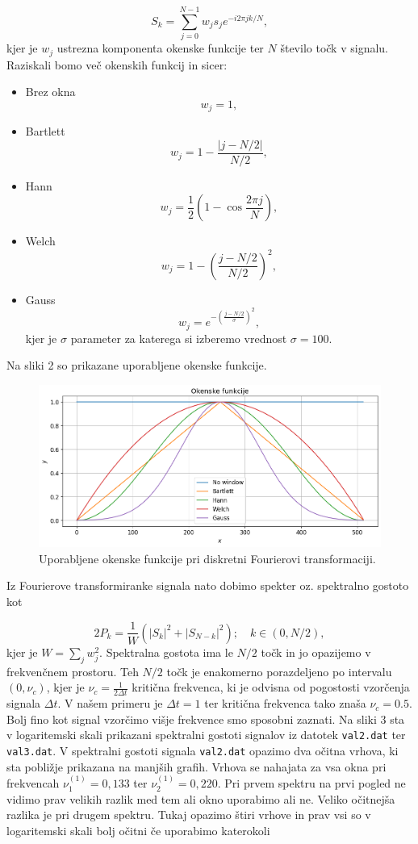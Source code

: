 \documentclass[slovene,11pt,a4paper]{article}
\begin{document}
\begin{equation}
S_k = \sum_{j=0}^{N-1} w_j s_j e^{-i 2\pi jk/N},
\end{equation}
kjer je $w_j$ ustrezna komponenta okenske funkcije ter $N$ število točk v signalu. Raziskali bomo več okenskih funkcij in sicer:

\begin{itemize}
\item Brez okna \[ w_j = 1, \]
\item Bartlett \[ w_j = 1 - \frac{|j- N/2|}{N/2}, \]
\item Hann \[ w_j = \frac{1}{2} \left( 1-\cos \frac{2\pi j}{N} \right), \]
\item Welch \[ w_j = 1 - \left( \frac{j - N/2}{N/2} \right)^2, \]
\item Gauss \[ w_j =  e^{-\left( \frac{j - N/2}{\sigma} \right)^2}, \] kjer je $\sigma$ parameter za katerega si izberemo vrednost $\sigma = 100$.
\end{itemize}
Na sliki 2 so prikazane uporabljene okenske funkcije.

\newpage

\begin{figure}[h!]
\centering
\includegraphics[width=12cm]{slika2.png}
\caption{Uporabljene okenske funkcije pri diskretni Fourierovi transformaciji.}
\end{figure}

Iz Fourierove transformiranke signala nato dobimo spekter oz. spektralno gostoto kot

\begin{equation}
2P_k = \frac{1}{W}(|S_k|^2 + |S_{N-k}|^2); \quad k \in (0, N/2),
\end{equation}
kjer je $W = \sum_j w_j^2$. Spektralna gostota ima le $N/2$ točk in jo opazijemo v frekvenčnem prostoru. Teh $N/2$ točk je enakomerno porazdeljeno po intervalu $(0, \nu_c)$, kjer je $\nu_c = \frac{1}{2\Delta t}$ kritična frekvenca, ki je odvisna od pogostosti vzorčenja signala $\Delta t$. V našem primeru je $\Delta t = 1$ ter kritična frekvenca tako znaša $\nu_c = 0.5$. Bolj fino kot signal vzorčimo višje frekvence smo sposobni zaznati. Na sliki 3 sta v logaritemski skali prikazani spektralni gostoti signalov iz datotek \texttt{val2.dat} ter \texttt{val3.dat}. V spektralni gostoti signala \texttt{val2.dat} opazimo dva očitna vrhova, ki sta pobližje prikazana na manjših grafih. Vrhova se nahajata za vsa okna pri frekvencah $\nu_1^{(1)} = 0,133$ ter $\nu_2^{(1)} = 0,220$. Pri prvem spektru na prvi pogled ne vidimo prav velikih razlik med tem ali okno uporabimo ali ne. Veliko očitnejša razlika je pri drugem spektru. Tukaj opazimo štiri vrhove in prav vsi so v logaritemski skali bolj očitni če uporabimo katerokoli
\end{document}
